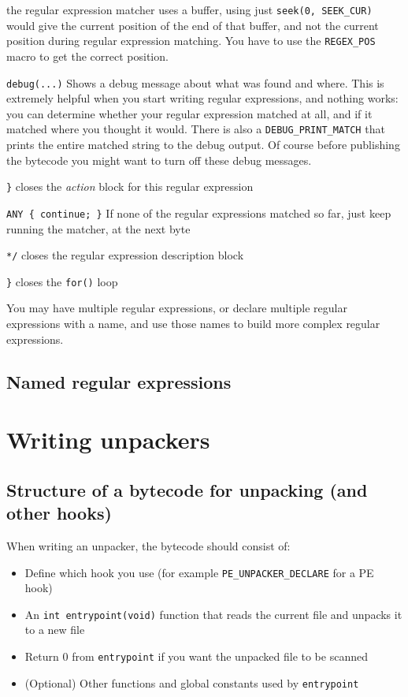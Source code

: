 \begin{description}
the regular expression matcher uses a buffer, using just \verb+seek(0, SEEK_CUR)+ would give the current position of the end of that buffer, and
not the current position during regular expression matching. You have to use the \verb+REGEX_POS+ macro to get the correct position.
 \item \verb+debug(...)+ Shows a debug message about what was found and where. This is extremely helpful when you start writing regular expressions, and
nothing works: you can determine whether your regular expression matched at all, and if it matched where you thought it would.
There is also a \verb+DEBUG_PRINT_MATCH+ that prints the entire matched string to the debug output.
Of course before publishing the bytecode you might want to turn off these debug messages.
 \item \verb+}+ closes the \emph{action} block for this regular expression
 \item \verb+ANY { continue; }+ If none of the regular expressions matched so far, just keep running the matcher, at the next byte
 \item \verb+*/+ closes the regular expression description block
 \item \verb+}+ closes the \verb+for()+ loop
\end{description}

You may have multiple regular expressions, or declare multiple regular expressions with a name, and use those
names to build more complex regular expressions.

\subsection{Named regular expressions}


\section{Writing unpackers}
\label{sec:unpacker}
\subsection{Structure of a bytecode for unpacking (and other hooks)}
When writing an unpacker, the bytecode should consist of:
\begin{itemize}
 \item Define which hook you use (for example \verb+PE_UNPACKER_DECLARE+ for a PE hook)
 \item An \verb+int entrypoint(void)+ function that reads the current file and unpacks it to a new file
 \item Return 0 from \verb+entrypoint+ if you want the unpacked file to be scanned %
 \item (Optional) Other functions and global constants used by \verb+entrypoint+
\end{itemize}

